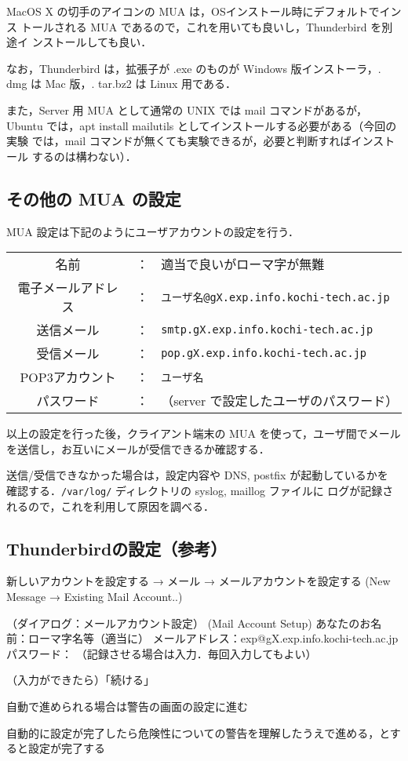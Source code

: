MacOS X の切手のアイコンの MUA は，OSインストール時にデフォルトでインス
トールされる MUA であるので，これを用いても良いし，Thunderbird を別途イ
ンストールしても良い．

なお，Thunderbird は，拡張子が .exe のものが Windows 版インストーラ，.
dmg は Mac 版，.  tar.bz2 は Linux 用である．

また，Server 用 MUA として通常の UNIX では mail コマンドがあるが，Ubuntu 
では，apt install mailutils としてインストールする必要がある（今回の実験
では，mail コマンドが無くても実験できるが，必要と判断すればインストール
するのは構わない）．

\subsection*{その他の MUA の設定}

MUA 設定は下記のようにユーザアカウントの設定を行う．

\begin{center}
\begin{breakbox}
\begin{tabular}{ccl}
名前&：&適当で良いがローマ字が無難\\
電子メールアドレス&：&\texttt{ユーザ名@gX.exp.info.kochi-tech.ac.jp}\\
送信メール&：&\texttt{smtp.gX.exp.info.kochi-tech.ac.jp}\\
受信メール&：&\texttt{pop.gX.exp.info.kochi-tech.ac.jp}\\
POP3アカウント&：&\texttt{ユーザ名}\\
パスワード&：&（server で設定したユーザのパスワード）
\end{tabular}
\end{breakbox}
\end{center}

以上の設定を行った後，クライアント端末の MUA を使って，ユーザ間でメール
を送信し，お互いにメールが受信できるか確認する．

送信/受信できなかった場合は，設定内容や DNS, postfix が起動しているかを
確認する．\texttt{/var/log/} ディレクトリの syslog, maillog ファイルに
ログが記録されるので，これを利用して原因を調べる．

\subsection*{Thunderbirdの設定（参考）}

\begin{cli}
新しいアカウントを設定する → メール → メールアカウントを設定する
(New Message → Existing Mail Account..)

（ダイアログ：メールアカウント設定）
  (Mail Account Setup)
あなたのお名前：ローマ字名等（適当に）
メールアドレス：exp@gX.exp.info.kochi-tech.ac.jp
パスワード： （記録させる場合は入力．毎回入力してもよい）

（入力ができたら）「続ける」

自動で進められる場合は警告の画面の設定に進む

自動的に設定が完了したら危険性についての警告を理解したうえで進める，とすると設定が完了する
\end{cli}

